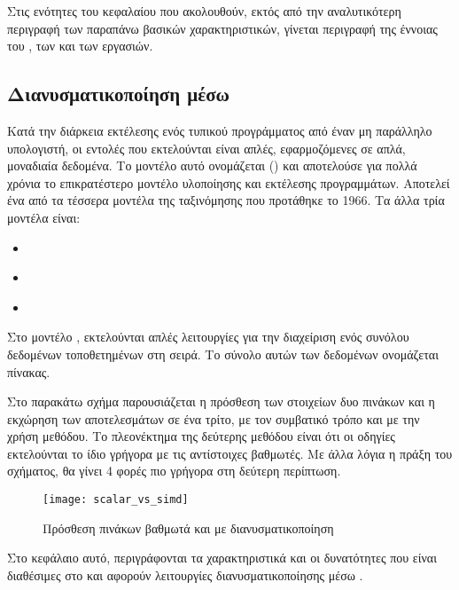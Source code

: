 Στις ενότητες του κεφαλαίου που ακολουθούν, εκτός από την αναλυτικότερη περιγραφή των παραπάνω βασικών χαρακτηριστικών,
γίνεται περιγραφή της έννοιας του \emph{}, των \emph{} και των
εργασιών\emph{}.

\clearpage
\subsection{Διανυσματικοποίηση μέσω \emph{}}
Κατά την διάρκεια εκτέλεσης ενός τυπικού προγράμματος από έναν μη παράλληλο υπολογιστή, οι εντολές που εκτελούνται είναι
απλές, εφαρμοζόμενες σε απλά, μοναδιαία δεδομένα. Το μοντέλο αυτό ονομάζεται (\emph{}) και αποτελούσε για πολλά χρόνια το επικρατέστερο μοντέλο υλοποίησης και εκτέλεσης προγραμμάτων.
Αποτελεί ένα από τα τέσσερα μοντέλα της ταξινόμησης \emph{} που προτάθηκε το 1966\cite{flynn}. Τα άλλα τρία
μοντέλα είναι: 
\begin{itemize}
\item{\emph{}}
\item{\emph{}}
\item{\emph{}}
\end{itemize}


Στο μοντέλο \emph{}, εκτελούνται απλές λειτουργίες για την διαχείριση ενός
συνόλου δεδομένων τοποθετημένων στη σειρά. Το σύνολο αυτών των δεδομένων ονομάζεται πίνακας.

Στο παρακάτω σχήμα παρουσιάζεται η πρόσθεση των στοιχείων δυο πινάκων και η εκχώρηση των αποτελεσμάτων σε ένα τρίτο,
με τον συμβατικό τρόπο και με την χρήση \emph{} μεθόδου. Το πλεονέκτημα της δεύτερης μεθόδου είναι ότι οι
\emph{} οδηγίες εκτελούνται το ίδιο γρήγορα με τις αντίστοιχες βαθμωτές. Με άλλα λόγια η πράξη του σχήματος, θα
γίνει 4 φορές πιο γρήγορα στη δεύτερη περίπτωση.

\begin{figure}[h]
\texttt{[image: scalar\_vs\_simd]}
\centering
\captionsetup{justification=centering, singlelinecheck=false}
	\caption{ Πρόσθεση πινάκων βαθμωτά και με διανυσματικοποίηση}
\label{fig:scalar_vs_simd}
\end{figure}

 Στο κεφάλαιο αυτό, περιγράφονται τα χαρακτηριστικά και οι δυνατότητες που είναι διαθέσιμες στο \emph{} και
 αφορούν λειτουργίες διανυσματικοποίησης μέσω \emph{}. 

